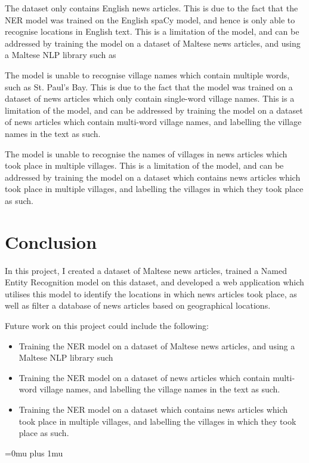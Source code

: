 \documentclass[a4paper, oneside, 11pt]{article}
\begin{document}
\begin{multicols*}{2}
  The dataset only contains English news articles. This is due to the fact that the NER model was trained on the English spaCy model, and hence is only able to recognise locations in English text. This is a limitation of the model, and can be addressed by training the model on a dataset of Maltese news articles, and using a Maltese NLP library such as

  The model is unable to recognise village names which contain multiple words, such as St. Paul's Bay. This is due to the fact that the model was trained on a dataset of news articles which only contain single-word village names. This is a limitation of the model, and can be addressed by training the model on a dataset of news articles which contain multi-word village names, and labelling the village names in the text as such.

  The model is unable to recognise the names of villages in news articles which took place in multiple villages. This is a limitation of the model, and can be addressed by training the model on a dataset which contains news articles which took place in multiple villages, and labelling the villages in which they took place as such.


  \section{Conclusion}
  In this project, I created a dataset of Maltese news articles, trained a Named Entity Recognition model on this dataset, and developed a web application which utilises this model to identify the locations in which news articles took place, as well as filter a database of news articles based on geographical locations.

  Future work on this project could include the following:
  \begin{itemize}
    \item Training the NER model on a dataset of Maltese news articles, and using a Maltese NLP library such
    \item Training the NER model on a dataset of news articles which contain multi-word village names, and labelling the village names in the text as such.
    \item Training the NER model on a dataset which contains news articles which took place in multiple villages, and labelling the villages in which they took place as such.
  \end{itemize}





  \newpage


  \Urlmuskip=0mu plus 1mu\relax
  
  

\end{multicols*}
\end{document}
